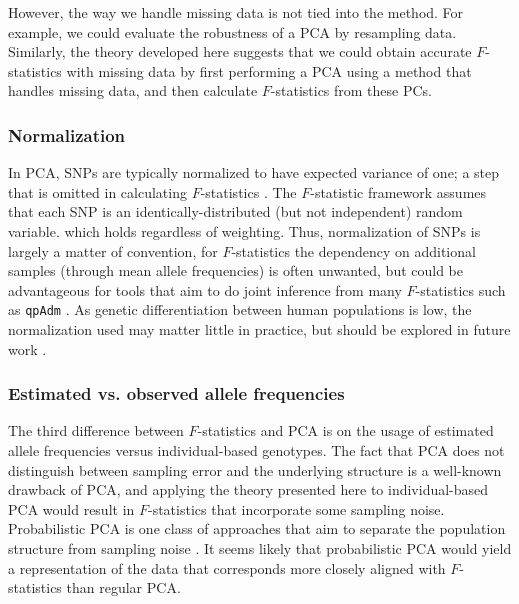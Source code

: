 \documentclass[12pt,fullpage, a4paper]{article}
\begin{document}
However, the way we handle missing data is not tied into the method. For example, we could evaluate the robustness of a PCA by resampling data. Similarly, the theory developed here suggests that we could obtain accurate $F$-statistics with missing data by first performing a PCA using a method that handles missing data, and then calculate $F$-statistics from these PCs.

\subsubsection{Normalization}
In PCA, SNPs are typically normalized to have expected variance of one; a step that is omitted in calculating $F$-statistics \citep{patterson2006}. The $F$-statistic framework assumes that each SNP is an identically-distributed (but not independent) random variable. which holds regardless of weighting. Thus, normalization of SNPs is largely a matter of convention, for  $F$-statistics the dependency on  additional samples (through  mean allele frequencies) is often unwanted, but could be advantageous for tools that aim to do joint inference from  many $F$-statistics such as \texttt{qpAdm} \citep{patterson2012, harney2021}. As genetic differentiation between human populations is low, the  normalization used may matter little in practice, but should be explored in future work \citep{felsenstein1973}. 


\subsubsection{Estimated vs. observed allele frequencies}
The third difference between $F$-statistics and PCA is on the usage of estimated allele frequencies versus individual-based genotypes. The fact that PCA does not distinguish between sampling error and the underlying structure is a well-known drawback of PCA, and applying the theory presented here to individual-based PCA would result in $F$-statistics that incorporate some sampling noise. Probabilistic PCA is one class of approaches that aim to separate the population structure from sampling noise \citep[e.g.][]{agrawal2020}. It seems likely that probabilistic PCA would yield a representation of the data that corresponds more closely aligned with $F$-statistics than regular PCA.
\end{document}
